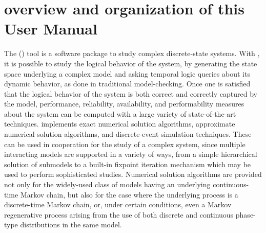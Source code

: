 %
%

\section*{{\smart} overview and organization of this User Manual}

The {\smart} ({\smartmeaning}) tool is a software package to study complex
discrete-state systems. With {\smart}, it is possible to study the
logical behavior of the system, by generating the state space
underlying a complex model and asking temporal logic queries about
its dynamic behavior, as done in traditional model-checking.
Once one is satisfied that the logical behavior of the
system is both correct and correctly captured by the model,
performance, reliability, availability, and performability
measures about the system can be computed with a large variety of
state-of-the-art techniques.
{\smart} implements exact numerical solution algorithms,
approximate numerical solution algorithms,
and discrete-event simulation techniques.
These can be used in cooperation for the study of a complex
system, since multiple interacting models are supported in a
variety of ways, from a simple hierarchical solution of submodels
to a built-in fixpoint iteration mechanism which may be used to
perform sophisticated studies.
Numerical solution
algorithms are provided not only for the widely-used class of
models having an underlying continuous-time Markov chain,
but also for the case where the underlying
process is a discrete-time Markov chain, or, under certain
conditions, even a Markov regenerative process arising from the
use of both discrete and continuous
phase-type distributions in the same model.


